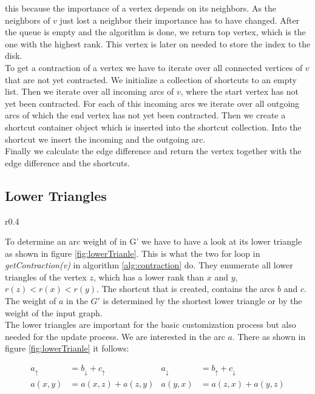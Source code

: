 this because the importance of a vertex depends on its neighbors. As the neighbors of $v$ just lost a neighbor their importance has to have changed.
After the queue is empty and the algorithm is done, we return top vertex, which is the one with the highest rank. This vertex is later on needed to store the index to the disk.
\\
To get a contraction of a vertex we have to iterate over all connected vertices of $v$ that are not yet contracted. We initialize  a collection of shortcuts to an empty list. Then we iterate over all incoming arcs of $v$, where the start vertex has not 
yet been contracted. For each of this incoming arcs we iterate over all outgoing arcs of which the end vertex has not yet been contracted. Then we create a shortcut container object which is inserted into the shortcut collection. Into the shortcut
we insert the incoming and the outgoing arc.
\\
Finally we calculate the edge difference and return the vertex together with the edge difference and the shortcuts.

\subsection{Lower Triangles}

\begin{wrapfigure}{r}{0.4\textwidth}
    \centering
    
    \caption{Lower Triangle}
    \label{fig:lowerTrianle}
\end{wrapfigure}


To determine an arc weight of in G' we have to have a look at its lower triangle as shown in figure \ref{fig:lowerTrianle}. This is what the two for loop in \textit{getContraction(v)} in algorithm \ref{alg:contraction} do. They enumerate all
lower triangles of the vertex $z$, which has a lower rank than $x$ and $y$, $r(z) < r(x) < r(y)$. The shortcut that is created, contains the arcs $b$ and $c$. The weight of $a$ in the $G'$ is determined by the shortest lower triangle or by the weight of the input graph. 
\\
The lower triangles are important for the basic customization process but also needed for the update process. We are interested in the arc $a$. There as shown in figure \ref{fig:lowerTrianle} it follows:


\begin{align*}\label{eq:lower_triangle}
    a_\uparrow & = b_\downarrow + c_\uparrow    &  a_\downarrow & = b_\uparrow + c_\downarrow \\
    a(x, y) & = a(x, z) + a(z, y) & a(y, x) & = a(z, x) + a(y, z)
\end{align*}

